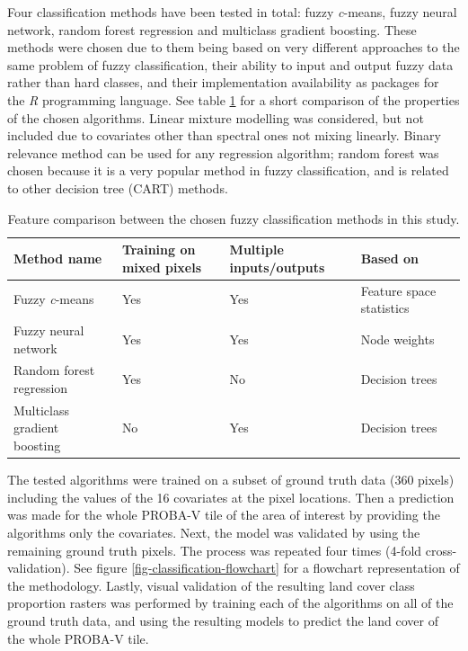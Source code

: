 \documentclass[a4paper,12pt]{scrbook}
\begin{document}
Four classification methods have been tested in total: fuzzy \textit{c}-means, fuzzy neural network, random forest regression and multiclass gradient boosting. These methods were chosen due to them being based on very different approaches to the same problem of fuzzy classification, their ability to input and output fuzzy data rather than hard classes, and their implementation availability as packages for the \textit{R} programming language. See table \ref{tbl-comparison} for a short comparison of the properties of the chosen algorithms. Linear mixture modelling was considered, but not included due to covariates other than spectral ones not mixing linearly. Binary relevance method can be used for any regression algorithm; random forest was chosen because it is a very popular method in fuzzy classification, and is related to other decision tree (CART) methods.

\begin{table}
  \begin{center}
      \begin{tabular}{lllll}
	\hline
	Method name & Training on mixed pixels & Multiple inputs/outputs & Based on\\
	\hline
	Fuzzy \textit{c}-means & Yes & Yes & Feature space statistics\\
	Fuzzy neural network & Yes & Yes & Node weights\\
	Random forest regression & Yes & No & Decision trees\\
	Multiclass gradient boosting & No & Yes & Decision trees\\
	\hline
      \end{tabular}
  \end{center}
  \caption{Feature comparison between the chosen fuzzy classification methods in this study.}
  \label{tbl-comparison}
\end{table}

The tested algorithms were trained on a subset of ground truth data (360 pixels) including the values of the 16 covariates at the pixel locations. Then a prediction was made for the whole PROBA-V tile of the area of interest by providing the algorithms only the covariates. Next, the model was validated by using the remaining ground truth pixels. The process was repeated four times (4-fold cross-validation). See figure \ref{fig-classification-flowchart} for a flowchart representation of the methodology. Lastly, visual validation of the resulting land cover class proportion rasters was performed by training each of the algorithms on all of the ground truth data, and using the resulting models to predict the land cover of the whole PROBA-V tile.
\end{document}
